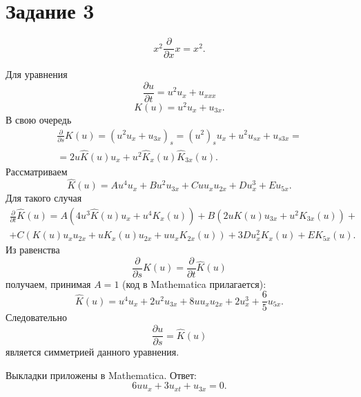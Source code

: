 \documentclass[a4paper]{article}
\begin{document}
\section*{Задание 3}
\begin{hiProb}[Упражнение 1.1]
\end{hiProb}
\begin{sol}
\[
x^2 \frac{\partial }{\partial x} x=x^2
.\] 
\end{sol}
\begin{hiProb}[Упражнение 1.2]
\end{hiProb}
\begin{sol}
Для уравнения
\[
\frac{\partial u}{\partial t} =u^2 u_x +u_{xxx}
\] 
\[
	K(u)=u^2u_x +u_{3x}
.\] 
В свою очередь
\begin{multline*}
	\frac{\partial }{\partial s} K(u)=
	(u^2u_x+u_{3x})_s=
	(u^2)_su_x+u^2u_{sx}+u_{s3x}=\\=
	2u \hat{K}(u)u_x+u^2 \hat{K}_x(u)  
	\hat{K}  _{3 x}(u)
.\end{multline*} 
Рассматриваем
\[
	\hat{K}(u)=Au^4 u_x +B u^2 u_{3x}+Cu u_x u_{2x}
	+D u^3_x+Eu_{5x}
.\] 
Для такого случая
\begin{multline*}
	\frac{\partial }{\partial t} \hat{K}(u)=
	A\left(4u^3 \hat{K}(u)u_x+u^4K_x(u)\right)+
	B\left(2uK(u)u_{3x}+u^2K_{3x}(u)\right)+\\+
	C\left( K(u)u_xu_{2x}+uK_x(u)u_{2x}+
	uu_x K_{2x}(u)\right) +3Du_x^2K_x(u)+
	E K_{5x}(u)
.\end{multline*} 
Из равенства
\[
	\frac{\partial }{\partial s} K(u)=
	\frac{\partial }{\partial t} \hat{K}(u)
\]
получаем, принимая $A=1$ (код в Mathematica прилагается):
\[
	\hat{K}(u)=u^4u_x+2u^2u_{3x}+8uu_xu_{2x}+
	2u_x^3+\frac{6}{5}u_{5x}
.\] 
Следовательно
\[
	\frac{\partial u}{\partial s} =\hat{K}(u)
\]
является симметрией данного уравнения.
\end{sol}
\begin{hiProb}[Упражнение 1.3]
\end{hiProb}
\begin{sol}
Выкладки приложены в Mathematica. Ответ:
\[
6uu_x+3u_{xt}+u_{3x}=0
.\] 
\end{sol}
\end{document}

